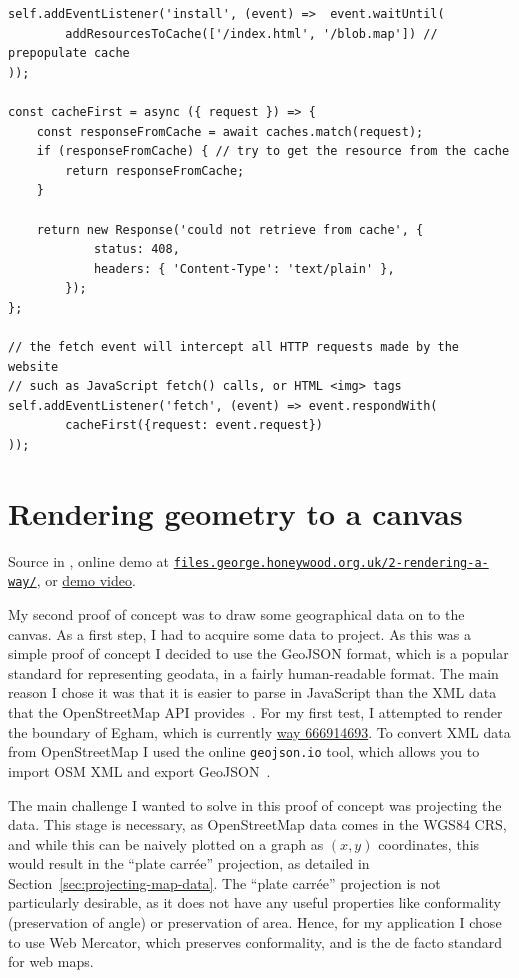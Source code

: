 \documentclass[hyphens]{final_report}
\begin{document}
\begin{lstlisting}[caption=Using the Service Worker cache]
self.addEventListener('install', (event) =>  event.waitUntil(
        addResourcesToCache(['/index.html', '/blob.map']) // prepopulate cache
));

const cacheFirst = async ({ request }) => {
    const responseFromCache = await caches.match(request);
    if (responseFromCache) { // try to get the resource from the cache
        return responseFromCache;
    }

    return new Response('could not retrieve from cache', {
            status: 408,
            headers: { 'Content-Type': 'text/plain' },
        });
};

// the fetch event will intercept all HTTP requests made by the website
// such as JavaScript fetch() calls, or HTML <img> tags
self.addEventListener('fetch', (event) => event.respondWith(
        cacheFirst({request: event.request})
));
\end{lstlisting}

\section{Rendering geometry to a canvas}

{ \footnotesize Source in , online demo at \href{https://files.george.honeywood.org.uk/2-rendering-a-way/}{\nolinkurl{files.george.honeywood.org.uk/2-rendering-a-way/}}, or \href{https://youtu.be/2F_vpCrQsO4}{demo video}.}

My second proof of concept was to draw some geographical data on to the canvas. As a first step, I had to acquire some data to project. As this was a simple proof of concept I decided to use the GeoJSON format, which is a popular standard for representing geodata, in a fairly human-readable format. The main reason I chose it was that it is easier to parse in JavaScript than the XML data that the OpenStreetMap API provides~\cite{osm-api-wiki}. For my first test, I attempted to render the boundary of Egham, which is currently \href{https://www.openstreetmap.org/way/666914693}{way 666914693}. To convert XML data from OpenStreetMap I used the online \texttt{geojson.io} tool, which allows you to import OSM XML and export GeoJSON~\cite{geojson.io}.

The main challenge I wanted to solve in this proof of concept was projecting the data. This stage is necessary, as OpenStreetMap data comes in the WGS84 CRS, and while this can be naively plotted on a graph as \((x,y)\) coordinates, this would result in the ``plate carrée'' projection, as detailed in Section~\ref{sec:projecting-map-data}. The ``plate carrée'' projection is not particularly desirable, as it does not have any useful properties like conformality (preservation of angle) or preservation of area. Hence, for my application I chose to use Web Mercator, which preserves conformality, and is the de facto standard for web maps.
\end{document}
